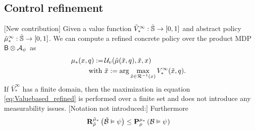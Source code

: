 \documentclass{ifacconf}
\newcommand{\red}[1]{{\color{red} #1}}
\begin{document}
%
%
%
%
%
%  
%
%
%

\subsection{Control refinement}
\red{[New contribution]}
Given a value function 
	$\tilde V^\infty_\ast:\tilde\S \rightarrow [0,1]$ and abstract policy 	$\tilde  \pol^\infty_\ast:\tilde\S \rightarrow [0,1]$. We can compute a refined  concrete policy over the product MDP $\MB\otimes\FSA_\psi$ as
	\begin{align}\label{eq:Valuebased_refined}
		\pol_\ast(x,q):=\, &\InF( \tilde{\pol}(\tilde x, q), \tilde x, x) \\ \mbox{ with } &\tilde x:=\arg\max_{ \tilde x\in
		\rel^{-1}(x)} \bar V^\infty_\ast(\tilde x,q).
	\end{align}
If  $\bar V^\infty_\ast$ has a finite domain, then  the maximization in equation \eqref{eq:Valuebased_refined} is performed over a finite set and does not introduce any measurability issues. 	\red{[Notation not introduced:]}
	Furthermore
\begin{align}
  \mathbf R^{\tilde \pol_\ast}_{\tilde\rho}\left(
\tilde{\mathcal{B}}
 \vDash \psi \right)\leq   \mathbf P^{ \pol_\ast} _{ \rho}\left(
 {\mathcal{B}}
 \vDash \psi \right)
\end{align}
	
\end{document}
